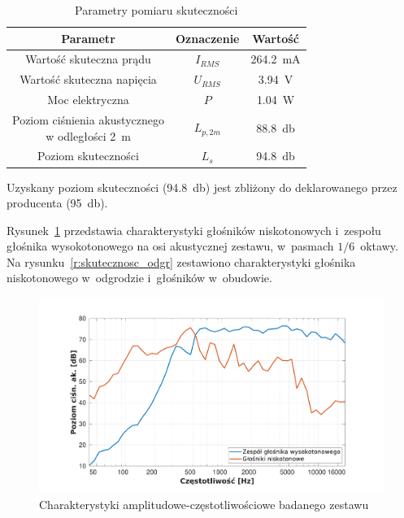 \documentclass[12pt]{oska}
\begin{document}
	\begin{table}[!ht]
		\centering
		\caption{Parametry pomiaru skuteczności}
		\label{t:skutecznosc}
		\begin{tabular}{|c|c|c|}
			\hline
			\textbf{Parametr} & \textbf{Oznaczenie} & \textbf{Wartość} \\\hline
			Wartość skuteczna prądu & $I_{RMS}$ & \SI{264,2}{\milli\ampere} \\\hline
			Wartość skuteczna napięcia & $U_{RMS}$ & \SI{3,94}{\volt} \\\hline
			Moc elektryczna & $P$ & \SI{1,04}{\watt} \\\hline
			\makecell{Poziom ciśnienia akustycznego\\w odległości \SI{2}{\metre}} & $L_{p,2m}$ & \SI{88,8}{\decibel} \\\hline
			Poziom skuteczności & $L_{s}$ & \SI{94,8}{\decibel} \\\hline
		\end{tabular}
	\end{table}
	
	Uzyskany poziom skuteczności (\SI{94,8}{\decibel}) jest zbliżony do deklarowanego przez producenta (\SI{95}{\decibel}).
	
	Rysunek~\ref{r:skutecznosc} przedstawia charakterystyki głośników niskotonowych i~zespołu głośnika wysokotonowego na osi akustycznej zestawu, w~pasmach $1/6$~oktawy. Na rysunku~\ref{r:skutecznosc_odgr} zestawiono charakterystyki głośnika niskotonowego w~odgrodzie i~głośników w~obudowie.
	
	\begin{figure}[!ht]
		\centering
		\includegraphics[width=.8\textwidth,trim={2cm .5cm 2cm 1cm},clip]{stolik_skutecznosci.pdf}
		\caption{Charakterystyki amplitudowe-częstotliwościowe badanego zestawu}
		\label{r:skutecznosc}
	\end{figure}
	
\end{document}
